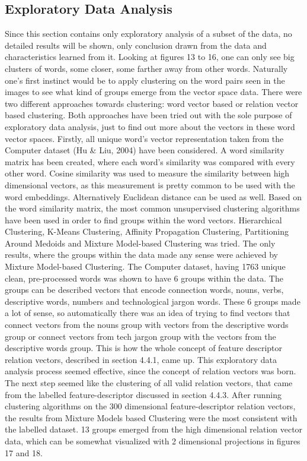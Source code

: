 \documentclass{sig-alternate}
\begin{document}
\subsection{Exploratory Data Analysis}
Since this section contains only exploratory analysis of a subset of the data, no detailed results will be shown, only conclusion drawn from the data and characteristics learned from it.
Looking at figures 13 to 16, one can only see big clusters of words, some closer, some farther away from other words. Naturally one's first instinct would be to apply clustering on the word pairs seen in the images to see what kind of groups emerge from the vector space data.
There were two different approaches towards clustering: word vector based or relation vector based clustering. Both approaches have been tried out with the sole purpose of exploratory data analysis, just to find out more about the vectors in these word vector spaces. 
Firstly, all unique word's vector representation taken from the Computer dataset (Hu \& Liu, 2004) have been considered. A word similarity matrix has been created, where each word's similarity was compared with every other word. Cosine similarity was used to measure the similarity between high dimensional vectors, as this measurement is pretty common to be used with the word embeddings. Alternatively Euclidean distance can be used as well.
Based on the word similarity matrix, the most common unsupervised clustering algorithms have been used in order to find groups within the word vectors. Hierarchical Clustering, K-Means Clustering, Affinity Propagation Clustering, Partitioning Around Medoids and Mixture Model-based Clustering was tried. The only results, where the groups within the data made any sense were achieved by Mixture Model-based Clustering. The Computer dataset, having 1763 unique clean, pre-processed words was shown to have 6 groups within the data. The groups can be described vectors that encode connection words, nouns, verbs, descriptive words, numbers and technological jargon words. These 6 groups made a lot of sense, so automatically there was an idea of trying to find vectors that connect vectors from the nouns group with vectors from the descriptive words group or connect vectors from tech jargon group with the vectors from the descriptive words group. This is how the whole concept of feature descriptor relation vectors, described in section 4.4.1, came up. This exploratory data analysis process seemed effective, since the concept of relation vectors was born. The next step seemed like the clustering of all valid relation vectors, that came from the labelled feature-descriptor discussed in section 4.4.3. 
After running clustering algorithms on the 300 dimensional feature-descriptor relation vectors, the results from Mixture Models based Clustering were the most consistent with the labelled dataset. 13 groups emerged from the high dimensional relation vector data, which can be somewhat visualized with 2 dimensional projections in figures 17 and 18.
\end{document}
